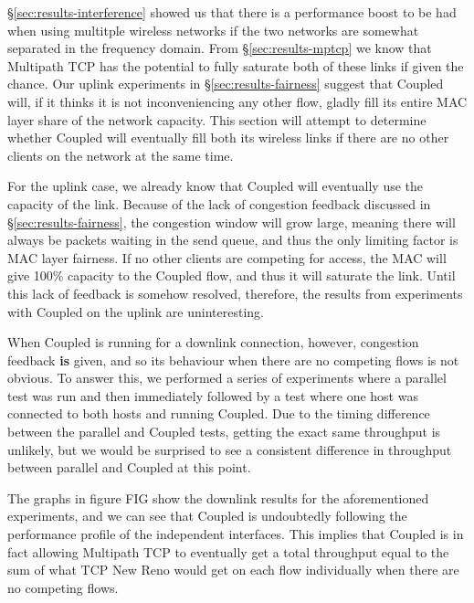 \S\ref{sec:results-interference} showed us that there is a performance
boost to be had when using multitple wireless networks if the two networks are
somewhat separated in the frequency domain. From \S\ref{sec:results-mptcp}
we know that Multipath TCP has the potential to fully saturate both of these
links if given the chance. Our uplink experiments in
\S\ref{sec:results-fairness} suggest that Coupled will, if it thinks it is
not inconveniencing any other flow, gladly fill its entire MAC layer share of the
network capacity. This section will attempt to determine whether Coupled will
eventually fill both its wireless links if there are no other clients on the
network at the same time.

For the uplink case, we already know that Coupled will eventually use the
capacity of the link. Because of the lack of congestion feedback discussed in
\S\ref{sec:results-fairness}, the congestion window will grow large,
meaning there will always be packets waiting in the send queue, and thus the
only limiting factor is MAC layer fairness. If no other clients are competing
for access, the MAC will give 100\% capacity to the Coupled flow, and thus it
will saturate the link. Until this lack of feedback is somehow resolved,
therefore, the results from experiments with Coupled on the uplink are
uninteresting.

When Coupled is running for a downlink connection, however, congestion feedback
\textbf{is} given, and so its behaviour when there are no competing flows is
not obvious. To answer this, we performed a series of experiments where a
parallel test was run and then immediately followed by a test where one host was
connected to both hosts and running Coupled. Due to the timing difference
between the parallel and Coupled tests, getting the exact same throughput is
unlikely, but we would be surprised to see a consistent difference in throughput
between parallel and Coupled at this point.

The graphs in figure FIG show the downlink results for the aforementioned
experiments, and we can see that Coupled is undoubtedly following the
performance profile of the independent interfaces. This implies that Coupled is
in fact allowing Multipath TCP to eventually get a total throughput equal to the
sum of what TCP New Reno would get on each flow individually when there are no
competing flows.
